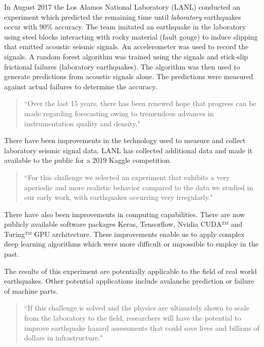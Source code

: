 \documentclass[]{llncs}
\begin{document}
In August 2017 the Los Alamos National Laboratory (LANL) conducted an experiment\cite{Bertrand} which predicted the remaining time until \emph{laboratory} earthquakes occur with 90\% accuracy. The team imitated an earthquake in the laboratory using steel blocks interacting with rocky material (fault gouge) to induce slipping that emitted acoustic seismic signals. An accelerometer was used to record the signals. A random forest algorithm was trained using the signals and stick‐slip frictional failures (laboratory earthquakes). The algorithm was then used to generate predictions from acoustic signals alone. The predictions were measured against actual failures to determine the accuracy.\cite{LANLNews}\par

\begin{quote}“Over the last 15 years, there has been renewed hope that progress can be made regarding forecasting owing to tremendous advances in instrumentation quality and density."\cite{Bertrand}\end{quote}

There have been improvements in the technology used to measure and collect laboratory seismic signal data. LANL has collected additional data and made it available to the public for a 2019 Kaggle competition. \par
\begin{quote}
	“For this challenge we selected an experiment that exhibits a very aperiodic and more realistic behavior compared to the data we studied in our early work, with earthquakes occurring very irregularly.\cite{kaggle}" 
\end{quote}

There have also been improvements in computing capabilities. There are now publicly available software packages Keras, Tensorflow, Nvidia CUDA™ and Turing™ GPU architecture. These improvements enable us to apply complex deep learning algorithms which were more difficult or impossible to employ in the past.\par

The results of this experiment are potentially applicable to the field of real world earthquakes. Other potential applications include avalanche prediction or failure of machine parts.
\begin{quote}
	“If this challenge is solved and the physics are ultimately shown to scale from the laboratory to the field, researchers will have the potential to improve earthquake hazard assessments that could save lives and billions of dollars in infrastructure.\cite{kaggle}"
\end{quote}
\end{document}
